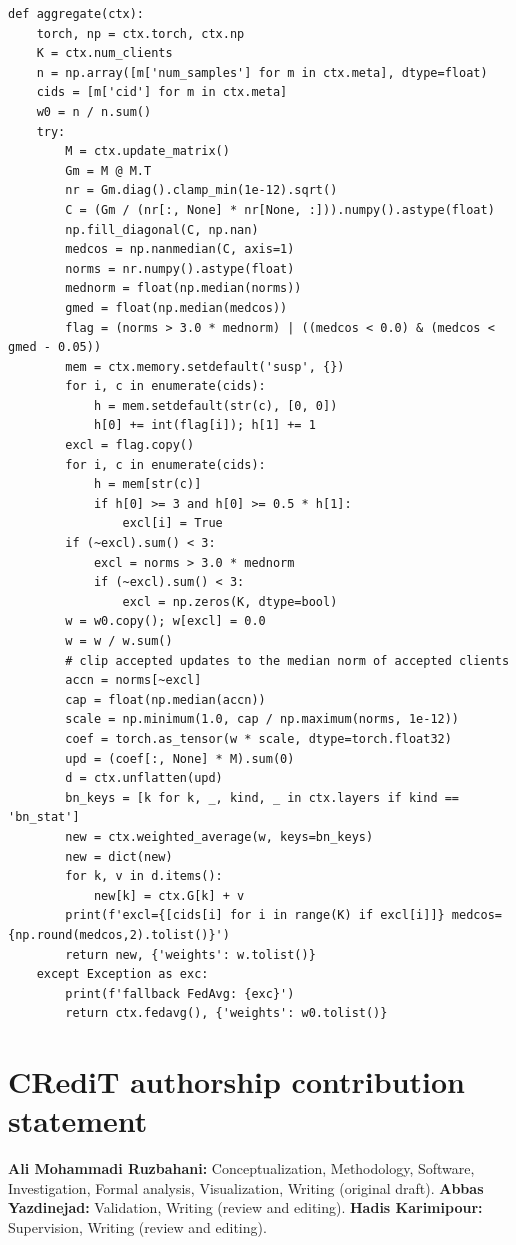 \documentclass[3p,times,a4paper]{elsarticle}
\begin{document}
\begin{lstlisting}[float=!t,caption={Program \texttt{policy\_001} of the sign-flip run (seed 0), as submitted at round 1.},label={lst:policy}]
def aggregate(ctx):
    torch, np = ctx.torch, ctx.np
    K = ctx.num_clients
    n = np.array([m['num_samples'] for m in ctx.meta], dtype=float)
    cids = [m['cid'] for m in ctx.meta]
    w0 = n / n.sum()
    try:
        M = ctx.update_matrix()
        Gm = M @ M.T
        nr = Gm.diag().clamp_min(1e-12).sqrt()
        C = (Gm / (nr[:, None] * nr[None, :])).numpy().astype(float)
        np.fill_diagonal(C, np.nan)
        medcos = np.nanmedian(C, axis=1)
        norms = nr.numpy().astype(float)
        mednorm = float(np.median(norms))
        gmed = float(np.median(medcos))
        flag = (norms > 3.0 * mednorm) | ((medcos < 0.0) & (medcos < gmed - 0.05))
        mem = ctx.memory.setdefault('susp', {})
        for i, c in enumerate(cids):
            h = mem.setdefault(str(c), [0, 0])
            h[0] += int(flag[i]); h[1] += 1
        excl = flag.copy()
        for i, c in enumerate(cids):
            h = mem[str(c)]
            if h[0] >= 3 and h[0] >= 0.5 * h[1]:
                excl[i] = True
        if (~excl).sum() < 3:
            excl = norms > 3.0 * mednorm
            if (~excl).sum() < 3:
                excl = np.zeros(K, dtype=bool)
        w = w0.copy(); w[excl] = 0.0
        w = w / w.sum()
        # clip accepted updates to the median norm of accepted clients
        accn = norms[~excl]
        cap = float(np.median(accn))
        scale = np.minimum(1.0, cap / np.maximum(norms, 1e-12))
        coef = torch.as_tensor(w * scale, dtype=torch.float32)
        upd = (coef[:, None] * M).sum(0)
        d = ctx.unflatten(upd)
        bn_keys = [k for k, _, kind, _ in ctx.layers if kind == 'bn_stat']
        new = ctx.weighted_average(w, keys=bn_keys)
        new = dict(new)
        for k, v in d.items():
            new[k] = ctx.G[k] + v
        print(f'excl={[cids[i] for i in range(K) if excl[i]]} medcos={np.round(medcos,2).tolist()}')
        return new, {'weights': w.tolist()}
    except Exception as exc:
        print(f'fallback FedAvg: {exc}')
        return ctx.fedavg(), {'weights': w0.tolist()}
\end{lstlisting}

\section*{CRediT authorship contribution statement}

\textbf{Ali Mohammadi Ruzbahani:} Conceptualization, Methodology, Software, Investigation, Formal analysis, Visualization, Writing (original draft). \textbf{Abbas Yazdinejad:} Validation, Writing (review and editing). \textbf{Hadis Karimipour:} Supervision, Writing (review and editing).
\end{document}
